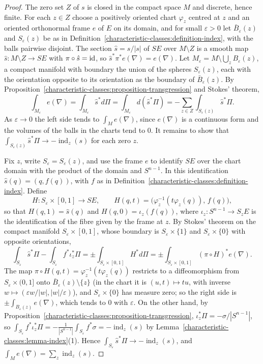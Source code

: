 \begin{proof}
The zero set $Z$ of $s$ is closed in the compact space $M$ and discrete, hence finite. For each $z \in Z$ choose a positively oriented chart $\varphi_z$ centred at $z$ and an oriented
orthonormal frame $e$ of $E$ on its domain, and for small $\varepsilon > 0$ let $\bar B_\varepsilon(z)$ and $S_\varepsilon(z)$ be as in Definition~\ref{characteristic-classes:definition-index},
with the balls pairwise disjoint. The section $\hat s = s/|s|$ of $SE$ over $M \setminus Z$ is a smooth map $\hat s \colon M \setminus Z \to SE$ with $\pi \circ \hat s = \mathrm{id}$, so
$\hat s^*\pi^*e(\nabla) = e(\nabla)$. Let $M_\varepsilon = M \setminus \bigcup_zB_\varepsilon(z)$, a compact manifold with boundary the union of the spheres $S_\varepsilon(z)$, each with the
orientation opposite to its orientation as the boundary of $\bar B_\varepsilon(z)$. By Proposition~\ref{characteristic-classes:proposition-transgression} and Stokes' theorem,
\[
\int_{M_\varepsilon}e(\nabla) = \int_{M_\varepsilon}\hat s^*d\Pi = \int_{M_\varepsilon}d(\hat s^*\Pi) = -\sum_{z \in Z}\int_{S_\varepsilon(z)}\hat s^*\Pi .
\]
As $\varepsilon \to 0$ the left side tends to $\int_Me(\nabla)$, since $e(\nabla)$ is a continuous form and the volumes of the balls in the charts tend to $0$. It remains to show that
$\int_{S_\varepsilon(z)}\hat s^*\Pi \to -\operatorname{ind}_z(s)$ for each zero $z$.

Fix $z$, write $S_\varepsilon = S_\varepsilon(z)$, and use the frame $e$ to identify $SE$ over the chart domain with the product of the domain and $S^{n-1}$. In this identification
$\hat s(q) = (q, f(q))$, with $f$ as in Definition~\ref{characteristic-classes:definition-index}. Define
\[
H \colon S_\varepsilon \times [0, 1] \to SE, \qquad H(q, t) = \bigl(\varphi_z^{-1}(t\varphi_z(q)),\, f(q)\bigr),
\]
so that $H(q, 1) = \hat s(q)$ and $H(q, 0) = \iota_z(f(q))$, where $\iota_z \colon S^{n-1} \to S_zE$ is the identification of the fibre given by the frame at $z$. By Stokes' theorem on the
compact manifold $S_\varepsilon \times [0, 1]$, whose boundary is $S_\varepsilon \times \{1\}$ and $S_\varepsilon \times \{0\}$ with opposite orientations,
\[
\int_{S_\varepsilon}\hat s^*\Pi - \int_{S_\varepsilon}f^*\iota_z^*\Pi = \pm\int_{S_\varepsilon \times [0, 1]}H^*d\Pi = \pm\int_{S_\varepsilon \times [0, 1]}(\pi \circ H)^*e(\nabla) .
\]
The map $\pi \circ H(q, t) = \varphi_z^{-1}(t\varphi_z(q))$ restricts to a diffeomorphism from $S_\varepsilon \times (0, 1]$ onto $\bar B_\varepsilon(z) \setminus \{z\}$ (in the chart it is
$(u, t) \mapsto tu$, with inverse $w \mapsto (\varepsilon w/|w|, |w|/\varepsilon)$), and $S_\varepsilon \times \{0\}$ has measure zero; so the right side is $\pm\int_{B_\varepsilon(z)}e(\nabla)$,
which tends to $0$ with $\varepsilon$. On the other hand, by Proposition~\ref{characteristic-classes:proposition-transgression}, $\iota_z^*\Pi = -\sigma/|S^{n-1}|$, so
$\int_{S_\varepsilon}f^*\iota_z^*\Pi = -\frac{1}{|S^{n-1}|}\int_{S_\varepsilon}f^*\sigma = -\operatorname{ind}_z(s)$ by Lemma~\ref{characteristic-classes:lemma-index}(1). Hence
$\int_{S_\varepsilon}\hat s^*\Pi \to -\operatorname{ind}_z(s)$, and $\int_Me(\nabla) = \sum_z\operatorname{ind}_z(s)$.
\end{proof}

